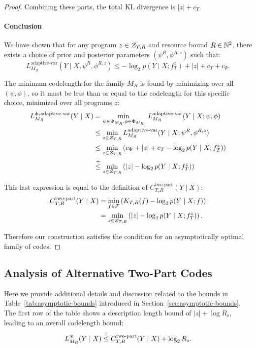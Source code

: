 \begin{proof}
Combining these parts, the total KL divergence is $|z| + c_T$.

\paragraph{Conclusion}
We have shown that for any program $z \in {\mathcal{Z}}_{T,R}$ and resource bound $R \in {\mathbb{N}^2}$, there exists a choice of prior and posterior parameters $(\psi^R, \phi^{R,z})$ such that:
\begin{equation}
L_{M_R}^{\text{adaptive-var}}(Y \mid X, \psi^R, \phi^{R,z}) \leq - \log_2 p(Y \mid X; f_T^z) + |z| + c_T + c_\Psi.
\end{equation}

The minimum codelength for the family $M_R$ is found by minimizing over all $(\psi, \phi)$, so it must be less than or equal to the codelength for this specific choice, minimized over all programs $z$:
\begin{align*}
L^{\bigast,\text{adaptive-var}}_{M_R}(Y \mid X) &= \min_{\psi \in \Psi_{M_R},\phi \in \Phi_{M_R}}~ L^{\text{adaptive-var}}_{M_R}(Y \mid X;\psi,\phi) \\
&\leq \min_{z \in \gZ_{T,R}} L^{\text{adaptive-var}}_{M_R}(Y \mid X;\psi^R,\phi^{R,z}) \\
&\leq \min_{z \in \gZ_{T,R}} \left( c_\Psi + |z| + c_T - \log_2 p(Y \mid X; f_T^z) \right) \\
&\leqc \min_{z \in \gZ_{T,R}} \left( |z| - \log_2 p(Y \mid X; f_T^z) \right)
\end{align*}

This last expression is equal to the definition of $C^{\text{two-part}}_{T,R}(Y \mid X)$:
\begin{align*}
C^{\text{two-part}}_{T,R}(Y \mid X) 
&= \min_{f \in {\mathcal{F}}} \left( K_{T,R}(f) - \log_2 p(Y \mid X; f) \right) \\ 
&= \min_{z \in {\mathcal{Z}}_{T,R}} \left( |z| - \log_2 p(Y \mid X; f_T^z) \right).
\end{align*}

Therefore our construction satisfies the condition for an asymptotically optimal family of codes.
\end{proof}


\subsection{Analysis of Alternative Two-Part Codes}
\label{sec:quasi-optimal}

Here we provide additional details and discussion related to the bounds in Table~\ref{tab:asymptotic-bounds} introduced in Section~\ref{sec:asymptotic-bounds}. The first row of the table shows a description length bound of $|z| + \log R_s$, leading to an overall codelength bound:
\begin{equation}
    L^{\bigast}_{M_R}(Y \mid X) \leqc C^{\text{two-part}}_{T,R}(Y \mid X) + \log_2 R_s.
\end{equation}

